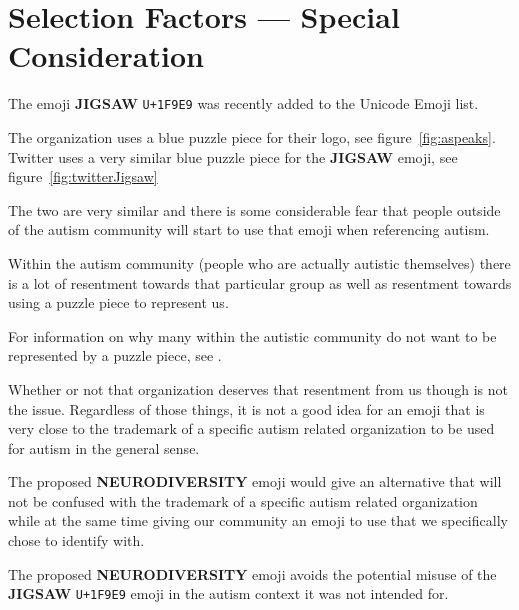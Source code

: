\section{Selection Factors --- Special Consideration}

The emoji \textbf{JIGSAW} \texttt{U+1F9E9} was recently added to the Unicode Emoji list.

The organization  uses a blue puzzle
piece for their logo, see figure~\ref{fig:aspeaks}. Twitter uses a very similar blue
puzzle piece for the \textbf{JIGSAW} emoji, see figure~\ref{fig:twitterJigsaw}

The two are very similar and there is some considerable fear that people outside of the
autism community will start to use that emoji when referencing autism.

Within the autism community (people who are actually autistic themselves) there is a lot of
resentment towards that particular group as well as resentment towards using a puzzle piece
to represent us.

For information on why many within the autistic community do not want to be represented by a
puzzle piece, see
.

Whether or not that organization deserves that resentment from us though is not the issue.
Regardless of those things, it is not a good idea for an emoji that is very close to the
trademark of a specific autism related organization to be used for autism in the general
sense.

The proposed \textbf{NEURODIVERSITY} emoji would give an alternative that will not be confused
with the trademark of a specific autism related organization while at the same time giving our
community an emoji to use that we specifically chose to identify with.

The proposed \textbf{NEURODIVERSITY} emoji avoids the potential misuse of the \textbf{JIGSAW} \texttt{U+1F9E9}
emoji in the autism context it was not intended for.


